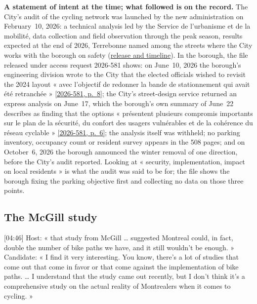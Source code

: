 \documentclass[11pt,letterpaper]{article}
\newcommand{\repourl}{https://github.com/OpenMobilityData/Terrebonne-open-sources}
\newcommand{\doc}[2]{\href{\repourl/blob/main/#1}{#2}}
\newcommand{\pagesurl}{https://openmobilitydata.github.io/Terrebonne-access-requests}
\newcommand{\cliptime}[1]{\textsf{\small[#1]}}
\newcommand{\pgl}[2]{\href{\pagesurl/2026-581/raw/01_emails_mandate_counts.pdf\#page=#1}{\textsf{\small[2026-581, p.~#2]}}}
\newcommand{\pg}[1]{\pgl{#1}{#1}}
\begin{document}
\textbf{A statement of intent at the time; what followed is on the record.}
The City's audit of the cycling network was launched by the new
administration on February~10, 2026: a technical analysis led by the Service
de l'urbanisme et de la mobilité, data collection and field observation
through the peak season, results expected at the end of 2026, Terrebonne named
among the streets where the City works with the borough on safety
(\doc{2026-city-audit-and-plan-velo/}{release and timeline}). In the borough,
the file released under access request 2026-581 shows: on June~10, 2026 the
borough's engineering division wrote to the City that the elected officials
wished to revisit the 2024 layout « avec l'objectif de redonner la bande de
stationnement qui avait été retranchée » \pg{8}; the City's street-design
service returned an express analysis on June~17, which the borough's own
summary of June~22 describes as finding that the options « présentent
plusieurs compromis importants sur le plan de la sécurité, du confort des
usagers vulnérables et de la cohérence du réseau cyclable » \pg{6}; the
analysis itself was withheld; no parking inventory, occupancy count or
resident survey appears in the 508 pages; and on October~6, 2026 the borough
announced the winter removal of one direction, before the City's audit
reported. Looking at « security, implementation, impact on local residents »
is what the audit was said to be for; the file shows the borough fixing the
parking objective first and collecting no data on those three points.

\subsection{The McGill study}

\cliptime{04:46} Host: « that study from McGill … suggested Montreal could, in
fact, double the number of bike paths we have, and it still wouldn't be
enough. » Candidate: « I find it very interesting. You know, there's a lot of
studies that come out that come in favor or that come against the
implementation of bike paths. … I understand that the study came out
recently, but I don't think it's a comprehensive study on the actual reality
of Montrealers when it comes to cycling. »
\end{document}
